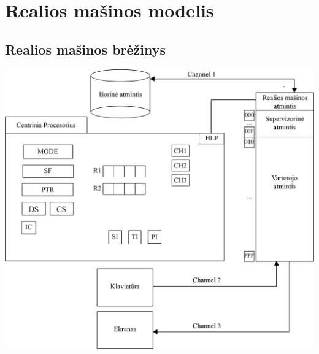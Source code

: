 \section{Realios mašinos modelis}
	\subsection{Realios mašinos brėžinys}
	\begin{flushleft}
	\includegraphics[scale=0.9]{OS15new.png}
	\end{flushleft}
